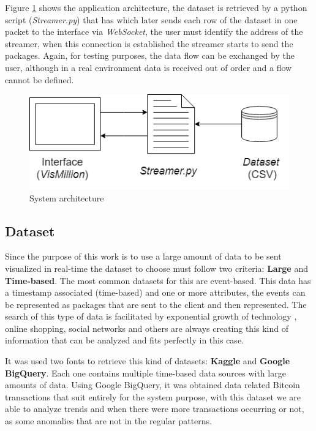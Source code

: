 \documentclass[letterpaper, 10 pt, conference]{ieeeconf}  %
\begin{document}
Figure \ref{fig:server_struct} shows the application architecture, the dataset is retrieved by a python script (\textit{Streamer.py}) that has which later sends each row of the dataset in one packet to the interface via \textit{WebSocket}, the user must identify the address of the streamer, when this connection is established the streamer starts to send the packages. Again, for testing purposes, the data flow can be exchanged by the user, although in a real environment data is received out of order and a flow cannot be defined.

\begin{figure}[h]
    \centering
    \includegraphics[width=0.9\linewidth]{Figures/server_Structure.png}
    \caption{System architecture}
        \label{fig:server_struct}
\end{figure}

\subsection{Dataset}
\label{subsection:dataset}
Since the purpose of this work is to use a large amount of data to be sent visualized in real-time the dataset to choose must follow two criteria: \textbf{Large} and \textbf{Time-based}. The most common datasets for this are event-based. This data has a timestamp associated (time-based) and one or more attributes, the events can be represented as packages that are sent to the client and then represented. The search of this type of data is facilitated by exponential growth of technology \cite{6567202}, online shopping, social networks and others are always creating this kind of information that can be analyzed and fits perfectly in this case.

It was used two fonts to retrieve this kind of datasets: \textbf{Kaggle} and \textbf{Google BigQuery}. Each one contains multiple time-based data sources with large amounts of data. Using Google BigQuery, it was obtained data related Bitcoin transactions that suit entirely for the system purpose, with this dataset we are able to analyze trends and when there were more transactions occurring or not, as some anomalies that are not in the regular patterns.
\end{document}
